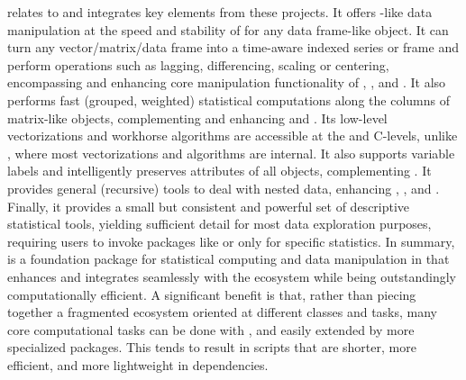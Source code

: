 \documentclass[article]{jss}
\begin{document}
 relates to and integrates key elements from these projects. It offers -like data manipulation at the speed and stability of  for any data frame-like object. It can turn any vector/matrix/data frame into a time-aware indexed series or frame and perform operations such as lagging, differencing, scaling or centering, encompassing and enhancing core manipulation functionality of , , and . It also performs fast (grouped, weighted) statistical computations along the columns of matrix-like objects, complementing and enhancing  and . Its low-level vectorizations and workhorse algorithms are accessible at the  and C-levels, unlike , where most vectorizations and algorithms are internal. It also supports variable labels and intelligently preserves attributes of all objects, complementing . It provides general (recursive) tools to deal with nested data, enhancing , , and . Finally, it provides a small but consistent and powerful set of descriptive statistical tools, yielding sufficient detail for most data exploration purposes, requiring users to invoke packages like  or  only for specific statistics. In summary,  is a foundation package for statistical computing and data manipulation in  that enhances and integrates seamlessly with the  ecosystem while being outstandingly computationally efficient. A significant benefit is that, rather than piecing together a fragmented ecosystem oriented at different classes and tasks, many core computational tasks can be done with , and easily extended by more specialized packages. This tends to result in  scripts that are shorter, more efficient, and more lightweight in dependencies. \newline
\end{document}
